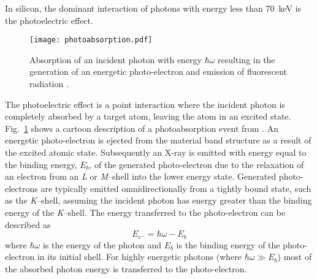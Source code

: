 In silicon, the dominant interaction of photons with energy less than 70~keV is the photoelectric effect. 
\begin{figure}[htbp]
    \begin{center}
        \texttt{[image: photoabsorption.pdf]}
    \end{center}
    \caption[Absorption of an incident photon with energy $\hbar \omega$ resulting in the generation of an energetic photo-electron and emission of fluorescent radiation.]{Absorption of an incident photon with energy $\hbar \omega$ resulting in the generation of an energetic photo-electron and emission of fluorescent radiation \cite{alpen1997radiation}.}
    \label{fig:photoabsorption}
\end{figure}
The photoelectric effect is a point interaction where the incident photon is completely absorbed by a target atom, leaving the atom in an excited state.
Fig.~\ref{fig:photoabsorption} shows a cartoon description of a photoabsorption event from \cite{alpen1997radiation}.
An energetic photo-electron is ejected from the material band structure as a result of the excited atomic state.
Subsequently an X-ray is emitted with energy equal to the binding energy, $E_b$, of the generated photo-electron due to the relaxation of an electron from an \emph{L} or \emph{M}--shell into the lower energy state.
Generated photo-electrons are typically emitted omnidirectionally from a tightly bound state, such as the \emph{K}--shell, assuming the incident photon has energy greater than the binding energy of the \emph{K}--shell.
The energy transferred to the photo-electron can be described as
\begin{equation}
    \label{eq:photo_electron_energy}
    E_{e^-} = \hbar \omega - E_{b}
\end{equation}
where $\hbar \omega$ is the energy of the photon and $E_b$ is the binding energy of the photo-electron in its initial shell.
For highly energetic photons (where $\hbar 
\omega \gg E_b$) most of the absorbed photon energy is transferred to the photo-electron.

